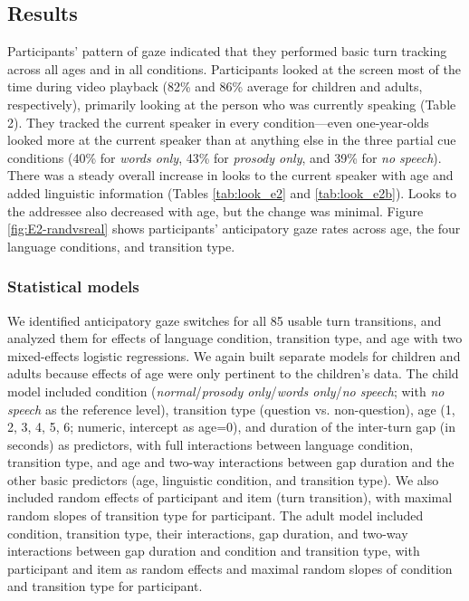 \documentclass[authoryear, 12pt]{elsarticle}
\begin{document}
\subsection*{Results}
\label{sec:results2}

Participants' pattern of gaze indicated that they performed basic turn tracking across all ages and in all conditions. Participants looked at the screen most of the time during video playback (82\% and 86\% average for children and adults, respectively), primarily looking at the person who was currently speaking (Table 2). They tracked the current speaker in every condition---even one-year-olds looked more at the current speaker than at anything else in the three partial cue conditions (40\% for \textit{words only}, 43\% for \textit{prosody only}, and 39\% for \textit{no speech}). There was a steady overall increase in looks to the current speaker with age and added linguistic information (Tables \ref{tab:look_e2} and \ref{tab:look_e2b}). Looks to the addressee also decreased with age, but the change was minimal. Figure \ref{fig:E2-randvsreal} shows participants' anticipatory gaze rates across age, the four language conditions, and transition type.

\subsubsection*{Statistical models}
\label{sec:models2}

We identified anticipatory gaze switches for all 85 usable turn transitions, and analyzed them for effects of language condition, transition type, and age with two mixed-effects logistic regressions. We again built separate models for children and adults because effects of age were only pertinent to the children's data. The child model included condition (\textit{normal}/\textit{prosody only}/\textit{words only}/\textit{no speech}; with \textit{no speech} as the reference level), transition type (question vs. non-question), age (1, 2, 3, 4, 5, 6; numeric, intercept as age=0), and duration of the inter-turn gap (in seconds) as predictors, with full interactions between language condition, transition type, and age and two-way interactions between gap duration and the other basic predictors (age, linguistic condition, and transition type).  We also included random effects of participant and item (turn transition), with maximal random slopes of transition type for participant. The adult model included condition, transition type, their interactions, gap duration, and two-way interactions between gap duration and condition and transition type, with participant and item as random effects and maximal random slopes of condition and transition type for participant.
\end{document}
